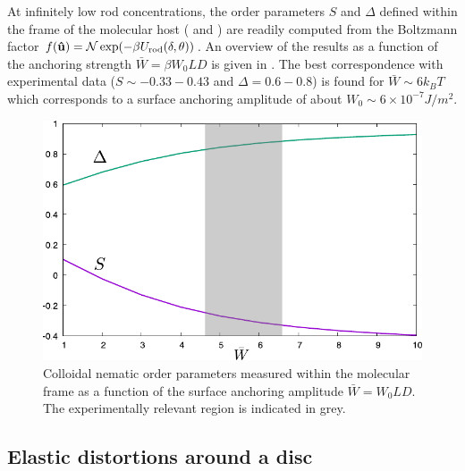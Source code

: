 At infinitely low rod concentrations, the order parameters $S$ and $\Delta$ defined within the frame of the  molecular host ( and ) are readily computed from the Boltzmann factor
  $f( {\bf \hat{u}} ) = \mathcal{N} \exp ( - \beta  U_{\rm rod} (\delta, \theta)   ) $.
An overview of the results as a function of the anchoring strength $\bar{W} = \beta W_{0} LD$ is given in . The best correspondence with experimental data ($S \sim -0.33 -0.43$ and $\Delta = 0.6 - 0.8$) is found for $ \bar{W} \sim 6 k_{B}T$ which corresponds to a surface anchoring  amplitude of about $W_{0}\sim 6 \times 10^{-7} J/m^{2}$.


\begin{figure}
	\includegraphics[width = .8\columnwidth]{figures/chapter-4/wwmans}
	\caption{ Colloidal nematic order parameters measured within the molecular frame as a function of
the surface anchoring amplitude $\bar{W} = W_{0}LD$. The experimentally relevant region is indicated in grey. }
	\label{ww}
\end{figure}

\subsection{Elastic distortions around a disc}


